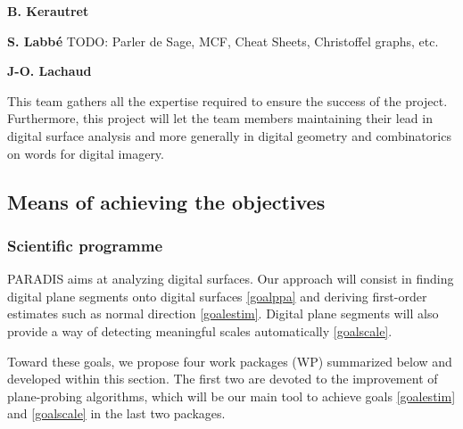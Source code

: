 \textbf{B. Kerautret} 

\textbf{S. Labb\'{e}} 
TODO: Parler de Sage, MCF, Cheat Sheets, Christoffel graphs, etc.

\textbf{J-O. Lachaud}


This team gathers all the expertise required to ensure the success of the project.
Furthermore, this project will let the team members maintaining their lead in digital surface analysis 
and more generally in digital geometry and combinatorics on words for digital imagery. 


\subsection{Means of achieving the objectives}


\subsubsection{Scientific programme}
\label{sec:wp}


PARADIS aims at analyzing digital surfaces. Our approach will consist in finding
digital plane segments onto digital surfaces \ref{goalppa} and deriving first-order
estimates such as normal direction \ref{goalestim}. Digital plane segments will
also provide a way of detecting meaningful scales automatically \ref{goalscale}.

Toward these goals, we propose four work packages (WP) summarized below and
developed within this section. The first two are devoted to the improvement of
plane-probing algorithms, which will be our main tool to achieve goals \ref{goalestim}
and \ref{goalscale} in the last two packages. 

